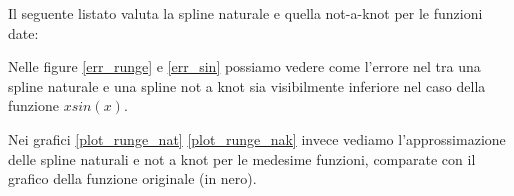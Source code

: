  Il seguente listato valuta la spline naturale e quella not-a-knot per le funzioni date:
\bnb

\enb

Nelle figure \ref{err_runge} e \ref{err_sin} possiamo vedere come l'errore nel tra una spline naturale e una spline not a knot sia visibilmente inferiore nel caso della funzione $xsin(x)$.

Nei grafici \ref{plot_runge_nat} \ref{plot_runge_nak} \label{plot_sin_nat} \label{plot_sin_nak} invece vediamo l'approssimazione delle spline naturali e not a knot per le medesime funzioni, comparate con il grafico della funzione originale (in nero).
